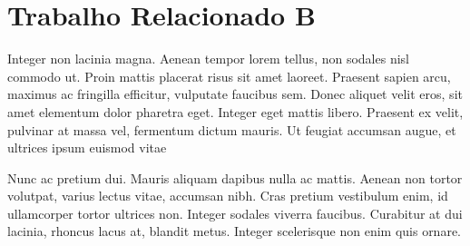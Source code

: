 \section{Trabalho Relacionado B}
\label{sec:trabalho-relacionado-b}

Integer non lacinia magna. Aenean tempor lorem tellus, non sodales nisl commodo ut. Proin mattis placerat risus sit amet laoreet. Praesent sapien arcu, maximus ac fringilla efficitur, vulputate faucibus sem. Donec aliquet velit eros, sit amet elementum dolor pharetra eget. Integer eget mattis libero. Praesent ex velit, pulvinar at massa vel, fermentum dictum mauris. Ut feugiat accumsan augue, et ultrices ipsum euismod vitae

	\begin{figure}[ht!]
		\centering
	\end{figure}

Nunc ac pretium dui. Mauris aliquam dapibus nulla ac mattis. Aenean non tortor volutpat, varius lectus vitae, accumsan nibh. Cras pretium vestibulum enim, id ullamcorper tortor ultrices non. Integer sodales viverra faucibus. Curabitur at dui lacinia, rhoncus lacus at, blandit metus. Integer scelerisque non enim quis ornare.

	\begin{quadro}[ht!]
		\centering
	\end{quadro}

